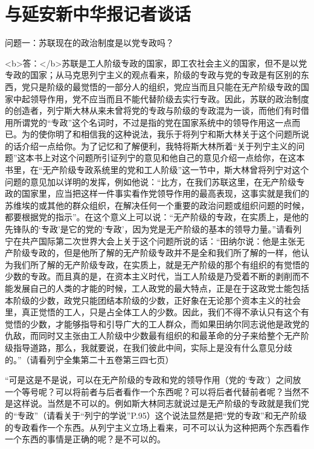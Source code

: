 \section[与延安新中华报记者谈话（一九三八年二日）]{与延安新中华报记者谈话}


问题一：苏联现在的政治制度是以党专政吗？

<b>答：</b>苏联是工人阶级专政的国家，即工农社会主义的国家，但不是以党专政的国家；从马克思列宁主义的观点看来，阶级的专政与党的专政是有区别的东西，党只是阶级的最觉悟的一部分人的组织，党应当而且只能在无产阶级专政的国家中起领导作用，党不应当而且不能代替阶级去实行专政。因此，苏联的政治制度的创造者，列宁斯大林从来未曾将党的专政与阶级的专政混为一谈，而他们有时借用所谓党的“专政”这个名词时，不过是指的党在国家系统中的领导作用这一点而已。为的使你明了和相信我的这种说法，我乐于将列宁和斯大林关于这个问题所说的话介绍一点给你。为了记忆和了解便利，我特将斯大林所着“关于列宁主义的问题”这本书上对这个问题所引证列宁的意见和他自己的意见介绍一点给你，在这本书里，在“无产阶级专政系统里的党和工人阶级”这一节中，斯大林曾将列宁对这个问题的意见加以详明的发挥，例如他说：“比方，在我们苏联这里，在无产阶级专政的国家里，应当把这样一件事实看作党领导作用的最高表现，这事实就是我们的苏维埃的或其他的群众组织，在解决任何一个重要的政治问题或组织问题的时候，都要根据党的指示”。在这个意义上可以说：“无产阶级的专政，在实质上，是他的先锋队的‘专政’是它的党的‘专政’，因为党是无产阶级的基本的领导力量。”请看列宁在共产国际第二次世界大会上关于这个问题所说的话：“田纳尔说：他是主张无产阶级专政的，但是他所了解的无产阶级专政并不是全和我们所了解的一样，他认为我们所了解的无产阶级专政，在实质上，就是无产阶级的那个有组织的有觉悟的少数的专政。而且真的是，在资本主义时代，当工人阶级是乃受着不断的剥削而不能发展自己的人类的才能的时候，工人政党的最大特点，正是在于这政党士能包括本阶级的少数，政党只能团结本阶级的少数，正好象在无论那个资本主义的社会里，真正觉悟的工人，只是占全体工人的少数。因此，我们不得不承认只有这个有觉悟的少数，才能够指导和引导广大的工人群众，而如果田纳尔同志说他是政党的仇敌，而同时又主张由工人阶级中少数最有组织的和最革命的分子来给整个无产阶级指导道路，那么，我就要说，在我们彼此中间，实际上是没有什么意见分歧的。”（请看列宁全集第二十五卷第三四七页）

“可是这是不是说，可以在无产阶级的专政和党的领导作用（党的‘专政’）之间放一个等号呢？可以将前者与后者看作一个东西呢？可以将后者代替前者呢？当然不是这样说。当然是不可以的。例如斯大林同志就说过是无产阶级的专政就是我们党的“专政”（请看关于“列宁的学说”P.95）这个说法显然是把“党的专政”和无产阶级的专政看作一个东西。从列宁主义立场上看来，可不可以认为这种把两个东西看作一个东西的事情是正确的呢？是不可以的。

